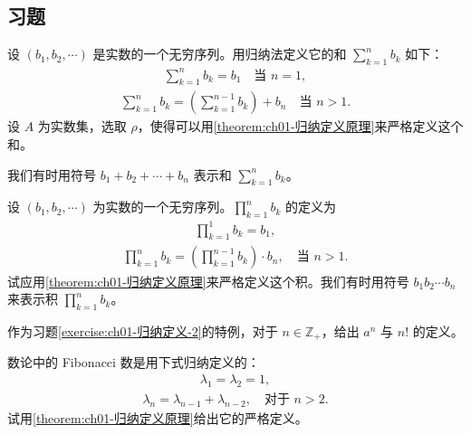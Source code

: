 \documentclass[../../main.tex]{subfiles}
\begin{document}
\subsection*{习题}

\begin{exercise}\label{exercise:ch01-归纳定义-1}
设 $(b_{1}, b_{2}, \cdots)$ 是实数的一个无穷序列。用归纳法定义它的和 $\sum_{k=1}^{n} b_{k}$ 如下：
\begin{align*}
\sum_{k=1}^{n} b_{k} = b_{1} \quad \text{当 } n = 1,
\end{align*}
\begin{align*}
\sum_{k=1}^{n} b_{k} = \left(\sum_{k=1}^{n-1} b_{k}\right) + b_{n} \quad \text{当 } n > 1.
\end{align*}
设 $A$ 为实数集，选取 $\rho$，使得可以用\cref{theorem:ch01-归纳定义原理}来严格定义这个和。

我们有时用符号 $b_{1} + b_{2} + \cdots + b_{n}$ 表示和 $\sum_{k=1}^{n} b_{k}$。
\end{exercise}

\begin{exercise}\label{exercise:ch01-归纳定义-2}
设 $(b_{1}, b_{2}, \cdots)$ 为实数的一个无穷序列。$\prod_{k=1}^{n} b_{k}$ 的定义为
\begin{align*}
\prod_{k=1}^{1} b_{k} = b_{1},
\end{align*}
\begin{align*}
\prod_{k=1}^{n} b_{k} = \left(\prod_{k=1}^{n-1} b_{k}\right) \cdot b_{n}, \quad \text{当 } n > 1.
\end{align*}
试应用\cref{theorem:ch01-归纳定义原理}来严格定义这个积。我们有时用符号 $b_{1}b_{2}\cdots b_{n}$ 来表示积 $\prod_{k=1}^{n} b_{k}$。
\end{exercise}

\begin{exercise}\label{exercise:ch01-归纳定义-3}
作为习题\cref{exercise:ch01-归纳定义-2}的特例，对于 $n \in \mathbb{Z}_{+}$，给出 $a^{n}$ 与 $n!$ 的定义。
\end{exercise}

\begin{exercise}\label{exercise:ch01-归纳定义-4}
数论中的 Fibonacci 数是用下式归纳定义的：
\begin{align*}
\lambda_{1} = \lambda_{2} = 1,
\end{align*}
\begin{align*}
\lambda_{n} = \lambda_{n-1} + \lambda_{n-2}, \quad \text{对于 } n > 2.
\end{align*}
试用\cref{theorem:ch01-归纳定义原理}给出它的严格定义。
\end{exercise}
\end{document}
